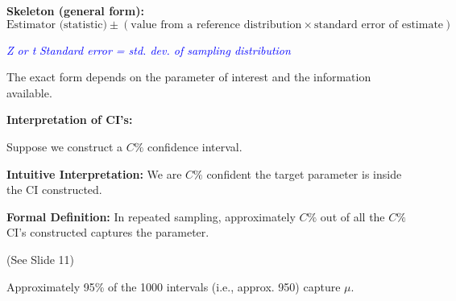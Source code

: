 \vspace{2em}

\noindent
\textbf{Skeleton (general form):}
\[
\text{Estimator (statistic)} \pm \left( \text{value from a reference distribution} \times \text{standard error of estimate} \right)
\]

\vspace{0.5em}
\textcolor{blue}{\textit{Z or t} \hspace{1em} \textit{Standard error = std. dev. of sampling distribution}}

\vspace{1em}
The exact form depends on the parameter of interest and the information available.

\vspace{2em}

\textbf{Interpretation of CI’s:}

Suppose we construct a $C\%$ confidence interval.

\vspace{0.5em}
\textbf{Intuitive Interpretation:} We are $C\%$ confident the target parameter is inside the CI constructed.

\vspace{0.5em}
\textbf{Formal Definition:} In repeated sampling, approximately $C\%$ out of all the $C\%$ CI’s constructed captures the parameter.

\vspace{1em}
(See Slide 11)

\vspace{2em}

\begin{center}
\begin{center}
\end{center}

\end{center}

\vspace{0.5em}
Approximately 95\% of the 1000 intervals (i.e., approx. 950) capture $\mu$.
